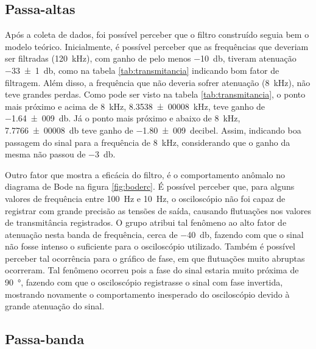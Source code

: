 \subsection{Passa-altas}

  Após a coleta de dados, foi possível perceber que o filtro construído seguia bem o modelo teórico. Inicialmente, é possível perceber que as frequências que deveriam ser filtradas (\SI{120}{\kilo\hertz}), com ganho de pelo menos \SI{-10}{\decibel}, tiveram atenuação \SI{-33(1)}{\decibel}, como na tabela \ref{tab:transmitancia} indicando bom fator de filtragem. Além disso, a frequência que não deveria sofrer atenuação (\SI{8}{\kilo\hertz}), não teve grandes perdas. Como pode ser visto na tabela \ref{tab:transmitancia}, o ponto mais próximo e acima de \SI{8}{\kilo\hertz}, \SI{8,3538(00008)}{\kilo\hertz}, teve ganho de \SI{-1,64(009)}{\decibel}. Já o ponto mais próximo e abaixo de \SI{8}{\kilo\hertz}, \SI{7,7766(00008)}{\decibel} teve ganho de \SI{-1,80(009)}{decibel}. Assim, indicando boa passagem do sinal para a frequência de \SI{8}{\kilo\hertz}, considerando que o ganho da mesma não passou de \SI{-3}{\decibel}.\par
  Outro fator que mostra a eficácia do filtro, é o comportamento anômalo no diagrama de Bode na figura \ref{fig:boderc}. É possível perceber que, para alguns valores de frequência entre \SI{100}{\hertz} e \SI{10}{\hertz}, o osciloscópio não foi capaz de registrar com grande precisão as tensões de saída, causando flutuações nos valores de transmitância registrados. O grupo atribui tal fenômeno ao alto fator de atenuação nesta banda de frequência, cerca de \SI{-40}{\decibel}, fazendo com que o sinal não fosse intenso o suficiente para o osciloscópio utilizado. Também é possível perceber tal ocorrência para o gráfico de fase, em que flutuações muito abruptas ocorreram. Tal fenômeno ocorreu pois a fase do sinal estaria muito próxima de \SI{90}{\degree}, fazendo com que o osciloscópio registrasse o sinal com fase invertida, mostrando novamente o comportamento inesperado do osciloscópio devido à grande atenuação do sinal.

\subsection{Passa-banda}
  
